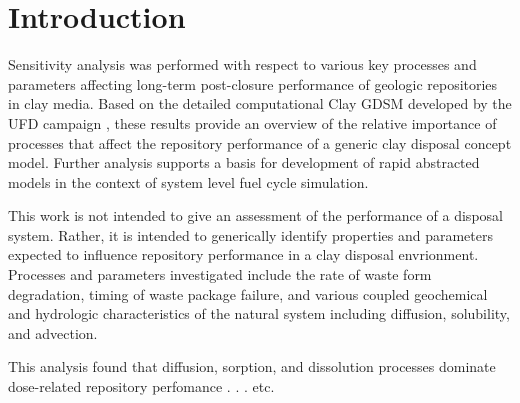 
\section{Introduction}

Sensitivity analysis was performed with respect to various key processes and 
parameters affecting long-term post-closure performance of geologic repositories 
in clay media. Based on the detailed computational Clay 
\gls{GDSM} developed by the \gls{UFD} campaign \cite{clayton_generic_2011}, 
these results provide an overview of the relative importance of processes 
that affect the repository performance of a generic clay disposal concept model. 
Further analysis supports a basis for development of rapid abstracted models in 
the context of system level fuel cycle simulation.

This work is not intended to give an assessment of the performance of a disposal 
system. Rather, it is intended to  generically identify properties and 
parameters expected to influence repository performance in a clay disposal 
envrionment.  Processes and parameters investigated  include the rate of waste 
form degradation, timing of waste package failure, and various coupled 
geochemical and hydrologic characteristics of the natural system including 
diffusion, solubility, and advection. 

This analysis found that diffusion, sorption, and dissolution processes dominate 
dose-related repository perfomance . . . etc.
